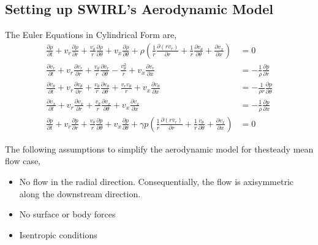 \subsection{Setting up SWIRL's Aerodynamic Model}
The Euler Equations in Cylindrical Form are,
\begin{align}
\frac{\partial \rho}{\partial t} + %
v_r \frac{\partial \rho}{\partial r} +
\frac{v_{\theta}   }{r}
\frac{\partial \rho}{\partial \theta} +
v_x \frac{\partial \rho}{\partial \theta} + 
\rho 
\left(
\frac{1}{r} \frac{\partial (rv_r)	}{\partial r} +
\frac{1}{r}	\frac{\partial v_{\theta}}{\partial \theta} +
\frac{\partial v_x}{\partial x}
\right) 
&= 0 \\%
\frac{\partial v_r}{\partial t} + 
v_r \frac{\partial v_r}{\partial r} +
\frac{v_{\theta}  }{r}
\frac{\partial v_r}{\partial \theta}- \frac{v_{\theta}^2}{r}+ 
v_x \frac{\partial v_r}{\partial x} 
&= -\frac{1}{\rho} \frac{\partial p}{\partial r}\\  
\frac{\partial v_{\theta}}{\partial t} + 
v_r \frac{\partial v_{\theta}}{\partial r} +
\frac{v_{\theta}}{r}
\frac{\partial v_{\theta}}{\partial \theta} +
\frac{v_r v_{\theta}}{r}+ 
v_x \frac{\partial v_{\theta}}{\partial x} 
&= -\frac{1}{\rho r} \frac{\partial p}{\partial \theta}\\ 
\frac{\partial v_{x}}{\partial t} + 
v_r 
\frac{\partial v_x}{\partial r} +
\frac{v_{\theta}}{r}
\frac{\partial v_x}{\partial \theta}+ 
v_x \frac{\partial v_x}{\partial x} 
&= 
-\frac{1}{\rho } 
\frac{\partial p}{\partial x}\\  
\frac{\partial p }{\partial t} +
v_r 
\frac{\partial p}{\partial r} +
\frac{v_{\theta}}{r}
\frac{\partial p}{\partial \theta} +
v_x \frac{\partial p}{\partial \theta} + 
\gamma p 
\left(
\frac{1}{r}\frac{\partial (rv_r)}{\partial r} +
\frac{1}{r}\frac{v_{\theta}}{\partial \theta} +
\frac{\partial v_x}{\partial x}
\right) &= 0
\end{align}

The following assumptions to simplify the aerodynamic model for thesteady mean
flow case,

\begin{itemize}
    \item No flow in the radial direction. Consequentially, the flow is 
        axisymmetric along the downstream direction.
    \item No surface or body forces
    \item Isentropic conditions 
\end{itemize}

